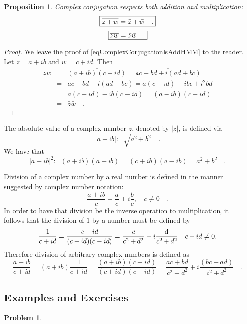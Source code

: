\documentclass[12pt]{book}
\newcommand{\eqdef}{\textbf{:=}}
\newtheorem{problem}[theorem]{Problem}
\newtheorem{prop}[theorem]{Proposition}
\begin{document}
\begin{prop}
Complex conjugation respects both addition and multiplication:
\begin{equation} \boxed{
\label{eqComplexConjugationIsAddHMM}
\overline {z +w}= \bar z +\bar w\quad .
}
\end{equation}
\begin{equation}\boxed{
\label{eqComplexConjugationIsFieldHMM}  \overline {z w}= \bar z \bar w\quad .
}
\end{equation}

\end{prop}
\begin{proof}
We leave the proof of \eqref{eqComplexConjugationIsAddHMM} to the reader. Let $z= a+ib$ and $w=c+id$. Then
\begin{equation*}
\begin{array}{rcl}\overline {zw}&=& \overline{(a+ib)(c+id)}= \overline{ac-bd +i(ad+bc) }\\&=& ac-bd-i(ad+bc)= a(c-id)-ibc+i^{2}bd\\&=& a(c-id)-ib(c-id)= (a-ib)(c-id)\\&=&\bar z \bar w\quad .
\end{array}
\end{equation*}
\end{proof}
  The absolute value of a complex number $z$, denoted by $|z|$, is defined via
\[
|a+ib|\eqdef \sqrt{a^2+b^2}\quad .
\]
We have that
\[
|a+ib|^2\eqdef (a+ib)\overline{(a+ib)}=(a+ib)(a-ib)=a^2+b^2 \quad .
\]

Division of a complex number by a real number is defined in the manner suggested by complex number notation:
\[
\frac{a+ib}{c}= \frac{a}{c}+i\frac{b}{c}, \quad c\neq 0\quad .
\]
In order to have that division be the inverse operation to multiplication, it follows that the division of $1$ by a number must be defined by
\[
\frac{1}{c+id}= \frac{c-id}{(c+id)(c-id)}=\frac{c}{c^2+d^2}-i\frac{{\normalfont \text{d}}}{c^2+d^2}  \quad c+id\neq 0.
\]
Therefore division of arbitrary complex numbers is defined as
\[
\frac{a+ib}{c+id}=(a+ib)\frac{1}{c+id}= \frac{(a+ib)(c-id)}{(c+id)(c-id)}= \frac{ac+bd}{c^2+d^2}+i\frac{(bc-ad)}{c^2+d^2} \quad .
\]

\subsection{Examples and Exercises}
\begin{problem}

\end{problem}

\end{document}
